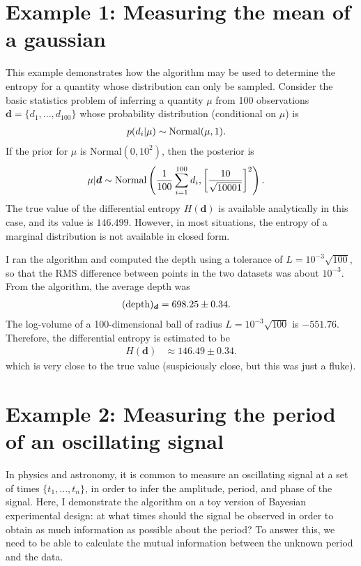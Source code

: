 \documentclass[entropy,article,accept,oneauthor,pdftex,10pt,a4paper]{mdpi}
\renewcommand{\d}{\boldsymbol{d}}
\newcommand{\depth}{(\textnormal{depth})}
\begin{document}
\section{Example 1: Measuring the mean of a gaussian}

This example demonstrates how the algorithm may be used to determine the
entropy for a quantity whose distribution can only be sampled.
Consider the basic statistics problem of inferring a quantity $\mu$ from
100 observations $\d = \{d_1, ..., d_{100}\}$ whose
probability distribution (conditional on $\mu$) is
\begin{align}
p(d_i | \mu) &\sim \textnormal{Normal}(\mu, 1).
\end{align}
If the prior for $\mu$ is Normal$(0, 10^2)$, then the posterior is
\begin{align}
\mu | \d &\sim \textnormal{Normal}\left(
                                       \frac{1}{100}\sum_{i=1}^{100} d_i,
                                       \left[\frac{10}{\sqrt{10001}}\right]^2
                                       \right).
\end{align}
The true value of the differential entropy $H(\d)$ is available analytically
in this case, and its value is $146.499$. However, in most situations, the
entropy of a marginal distribution is not available in closed form. 

I ran the algorithm and computed the depth using a tolerance of
$L=10^{-3}\sqrt{100}$, so that the RMS difference between
points in the two datasets was about $10^{-3}$.
From the algorithm, the average depth was
\begin{align}
\depth_{\d} &= 698.25 \pm 0.34.
\end{align}
The log-volume of a 100-dimensional ball of radius
$L=10^{-3}\sqrt{100}$ is
$-551.76$. Therefore, the differential entropy is estimated to be
\begin{align}
H(\d) &\approx 146.49 \pm 0.34.
\end{align}
which is very close to the true value (suspiciously close, but this
was just a fluke).




\section{Example 2: Measuring the period of an oscillating signal}

In physics and astronomy, it is common to measure an oscillating signal
at a set of times $\{t_1, ..., t_n\}$, in order to infer the amplitude,
period, and phase of the signal.
Here, I demonstrate the algorithm on a toy version
of Bayesian experimental design: at what times should the signal be
observed in order to obtain as much information as possible about the
period? To answer this, we need to be able to calculate the mutual
information between the unknown period and the data.
\end{document}

